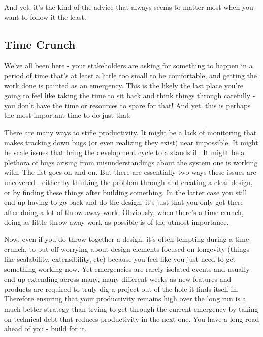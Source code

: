 \documentclass[10pt,a5paper]{book}
\begin{document}
And yet, it's the kind of the advice that always seems to matter most when you want to follow it the least.

\subsection{Time Crunch}
We've all been here - your stakeholders are asking for something to happen in a period of time that's at least a little too small to be comfortable, and getting the work done is painted as an emergency. This is the likely the last place you're going to feel like taking the time to sit back and think things through carefully - you don't have the time or resources to spare for that! And yet, this is perhaps the most important time to do just that. 

There are many ways to stifle productivity. It might be a lack of monitoring that makes tracking down bugs (or even realizing they exist) near impossible. It might be scale issues that bring the development cycle to a standstill. It might be a plethora of bugs arising from misunderstandings about the system one is working with. The list goes on and on. But there are essentially two ways these issues are uncovered - either by thinking the problem through and creating a clear design, or by finding these things after building something. In the latter case you still end up having to go back and do the design, it's just that you only got there after doing a lot of throw away work. Obviously, when there's a time crunch, doing as little throw away work as possible is of the utmost importance. 

Now, even if you do throw together a design, it's often tempting during a time crunch, to put off worrying about design elements focused on longevity (things like scalability, extensibility, etc) because you feel like you just need to get something working now. Yet emergencies are rarely isolated events and usually end up extending across many, many different weeks as new features and products are required to truly dig a project out of the hole it finds itself in. Therefore ensuring that your productivity remains high over the long run is a much better strategy than trying to get through the current emergency by taking on technical debt that reduces productivity in the next one. You have a long road ahead of you - build for it. 
\end{document}
